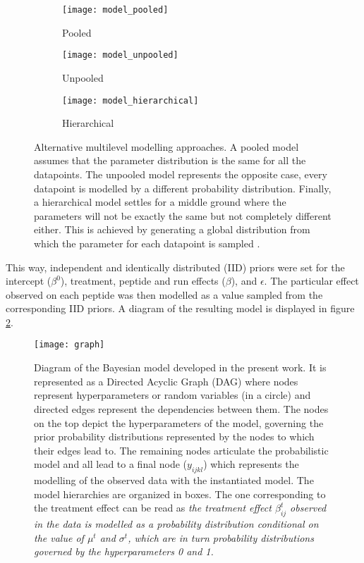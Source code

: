 \begin{figure}[!h]
\centering
\begin{subfigure}{.9\textwidth}
\centering
\caption*{Pooled}
\texttt{[image: model\_pooled]}
\end{subfigure}
\bigskip
\begin{subfigure}{.9\textwidth}
\centering
\caption*{Unpooled}
\texttt{[image: model\_unpooled]}
\end{subfigure}
\bigskip
\begin{subfigure}{.9\textwidth}
\centering
\caption*{Hierarchical}
\texttt{[image: model\_hierarchical]}
\end{subfigure}
\caption[]{Alternative multilevel modelling approaches. A pooled model assumes that the parameter distribution is the same for all the datapoints.  The unpooled model represents the opposite case, every datapoint is modelled by a different probability distribution. Finally, a hierarchical model settles for a middle ground where the parameters will not be exactly the same but not completely different either. This is achieved by generating a global distribution from which the parameter for each datapoint is sampled \footnotemark{}.}
\label{fig:multilevel}
\end{figure}



This way, independent and identically distributed (\ac{IID}) priors were set for the intercept ($\beta^0$), treatment, peptide and run effects ($\beta$), and $\epsilon$. The particular effect observed on each peptide was then modelled as a value sampled from the corresponding \ac{IID} priors. A diagram of the resulting model is displayed in figure \ref{fig:daft_model}.

\begin{figure}[!h]
\centering
\texttt{[image: graph]}
\caption[Bayesian model simplified diagram]{Diagram of the Bayesian model developed in the present work. It is represented as a Directed Acyclic Graph (\ac{DAG}) where nodes represent hyperparameters or random variables (in a circle) and directed edges  represent the dependencies between them. The nodes on the top depict the hyperparameters of the model, governing the prior probability distributions represented by the nodes to which their edges lead to. The remaining nodes articulate the probabilistic model and all lead to a final node ($y_{ijkl}$) which represents the modelling of the observed data with the instantiated model. The model hierarchies are organized in boxes. The one corresponding to the treatment effect can be read as \textit{the treatment effect $\beta_{ij}^{t}$ observed in the data is modelled as a probability distribution conditional on the value of $\mu^t$ and $\sigma^t$, which are in turn probability distributions governed by the hyperparameters 0 and 1.}}
\label{fig:daft_model}
\end{figure}

